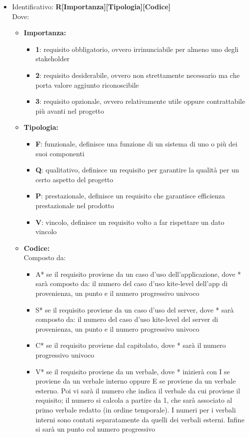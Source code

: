 \begin{itemize}
	\item Identificativo: \textbf{R[Importanza][Tipologia][Codice]}\\
Dove:
\begin{itemize}
		\item \textbf{Importanza:}
		\begin{itemize}
			\item \textbf{1}: requisito obbligatorio, ovvero irrinunciabile per almeno uno degli stakeholder
			\item \textbf{2}: requisito desiderabile, ovvero non strettamente necessario ma che porta valore aggiunto riconoscibile
			\item \textbf{3}: requisito opzionale, ovvero relativamente utile oppure contrattabile più avanti nel progetto
		\end{itemize}
		\item \textbf{Tipologia:}
		\begin{itemize}
			\item \textbf{F}: funzionale, definisce una funzione di un sistema di uno o più dei suoi componenti
			\item \textbf{Q}: qualitativo, definisce un requisito per garantire la qualità per un certo aspetto del progetto
			\item \textbf{P}: prestazionale, definisce un requisito che garantisce efficienza prestazionale nel prodotto
			\item \textbf{V}: vincolo, definisce un requisito volto a far rispettare un dato vincolo
		\end{itemize}
		\item \textbf{Codice:}\\
		Composto da:
		\begin{itemize}
			\item A* se il requisito proviene da un caso d'uso dell'applicazione, dove * sarà composto da: il numero del caso d'uso kite-level dell'app di provenienza, un punto e il numero progressivo univoco
			\item S* se il requisito proviene da un caso d'uso del server, dove * sarà composto da: il numero del caso d'uso kite-level del server di provenienza, un punto e il numero progressivo univoco
			\item C* se il requisito proviene dal capitolato, dove * sarà il numero progressivo univoco
			\item V* se il requisito proviene da un verbale, dove * inizierà con I se proviene da un verbale interno oppure E se proviene da un verbale esterno. Poi vi sarà il numero che indica il verbale da cui proviene il requisito; il numero si calcola a partire da 1, che sarà associato al primo verbale redatto (in ordine temporale). I numeri per i verbali interni sono contati separatamente da quelli dei verbali esterni. Infine si sarà un punto col numero progressivo

\end{itemize}
\end{itemize}
\end{itemize}
